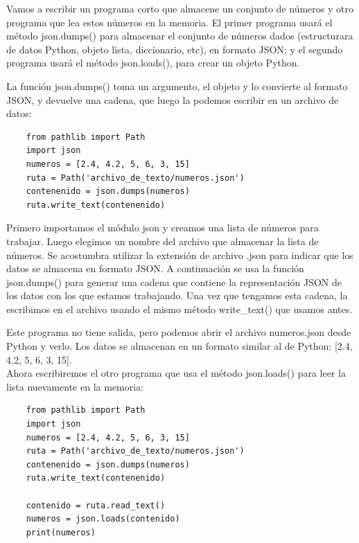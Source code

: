 Vamos a escribir un programa corto que almacene un conjunto de números y otro programa
que lea estos números en la memoria. El primer programa usará el método {\ttfamily json.dumps()} para almacenar el conjunto de números dados (estructurara de datos Python, objeto lista, diccionario, etc), en formato {\ttfamily JSON}; y el segundo programa usará el método {\ttfamily json.loads()}, para crear un objeto Python.


La función {\ttfamily json.dumps()} toma un argumento, el objeto y lo
convierte al formato {\ttfamily JSON}, y devuelve una cadena, que luego la podemos escribir en un archivo de datos:


\hspace{-2.4cm}{\ttfamily \scriptsize json\_}

\vspace{-0.2cm}
\hspace{-2.4cm}{\ttfamily \scriptsize escribir.py}\vspace{-0.84cm}
\begin{lstlisting}
	from pathlib import Path
	import json
	numeros = [2.4, 4.2, 5, 6, 3, 15]
	ruta = Path('archivo_de_texto/numeros.json')
	contenenido = json.dumps(numeros)
	ruta.write_text(contenenido)
\end{lstlisting}
Primero importamos el módulo {\ttfamily json} y  creamos una lista de números para
trabajar. Luego elegimos un nombre del archivo  que almacenar la lista de números. Se acostumbra utilizar la extensión 
de archivo {\ttfamily .json} para indicar que los datos se almacena en formato {\ttfamily JSON}. 
A continuación se usa la función {\ttfamily json.dumps()}
para generar una cadena que contiene la representación {\ttfamily JSON} de los
datos con los que estamos trabajando. Una vez que tengamos esta cadena, la escribimos en el archivo
usando el mismo método {\ttfamily  write\_text()} que usamos antes.

Este programa no tiene salida, pero podemos abrir el archivo {\ttfamily numeros.json} desde Python y verlo. Los datos se almacenan en un formato similar al de Python: [2.4, 4.2, 5, 6, 3, 15].\\

Ahora escribiremos el otro programa que usa el método {\ttfamily json.loads()} para leer la lista nuevamente en la memoria:

\hspace{-2.1cm}{\ttfamily \scriptsize json\_}

\vspace{-0.3cm}
\hspace{-2.1cm}{\ttfamily \scriptsize leer.py}\vspace{-0.92cm}
\begin{lstlisting}
	from pathlib import Path
	import json
	numeros = [2.4, 4.2, 5, 6, 3, 15]
	ruta = Path('archivo_de_texto/numeros.json')
	contenenido = json.dumps(numeros)
	ruta.write_text(contenenido)
	
	contenido = ruta.read_text()
	numeros = json.loads(contenido)
	print(numeros)
\end{lstlisting}

